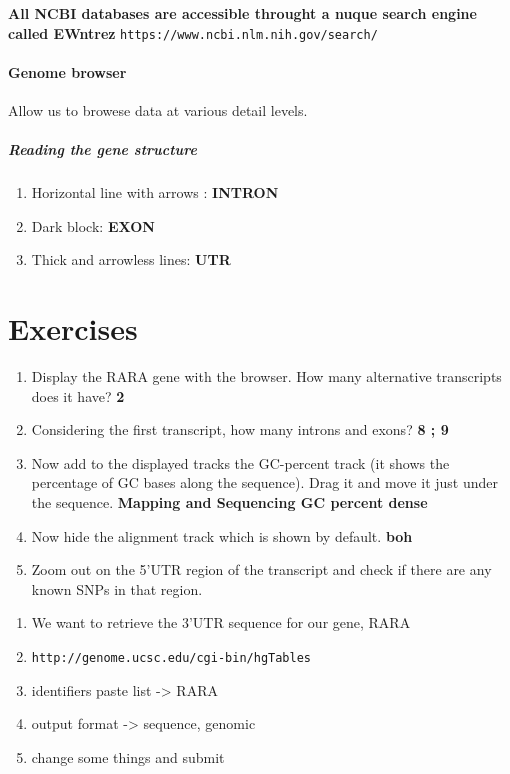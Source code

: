 \documentclass[11pt]{article}
\begin{document}
\textbf{All NCBI databases are accessible throught a nuque search engine called EWntrez} \texttt{https://www.ncbi.nlm.nih.gov/search/}

\paragraph{Genome browser} %
\label{par:genome_browser}
Allow us to browese data at various detail levels.

\subparagraph{Reading the gene structure} %
\label{subp:reading_the_gene_structure}
\begin{enumerate}
	\item Horizontal line with arrows : \textbf{INTRON}
	\item Dark block: \textbf{EXON}	
	\item Thick and arrowless lines: \textbf{UTR}
\end{enumerate}

\section{Exercises} %
\label{sec:exercises}
\begin{enumerate}
	\item Display the RARA gene with the browser. How many alternative transcripts does it have? \textbf{2}
	\item Considering the first transcript, how many introns and exons? \textbf{8 ; 9 }
	\item Now add to the displayed tracks the GC-percent track (it shows the percentage of GC bases along the sequence). Drag it and move it just under the sequence. \textbf{Mapping and Sequencing GC percent dense}
	\item Now hide the alignment track which is shown by default. \textbf{boh}
	\item Zoom out on the 5’UTR region of the transcript and check if there are any known SNPs in that region.
\end{enumerate}
\begin{enumerate}
	\item We want to retrieve the 3’UTR sequence for our gene, RARA
	\item \texttt{http://genome.ucsc.edu/cgi-bin/hgTables}
	\item identifiers paste list -> RARA
	\item output format -> sequence, genomic
	\item change some things and submit
\end{enumerate}
 
\end{document}
